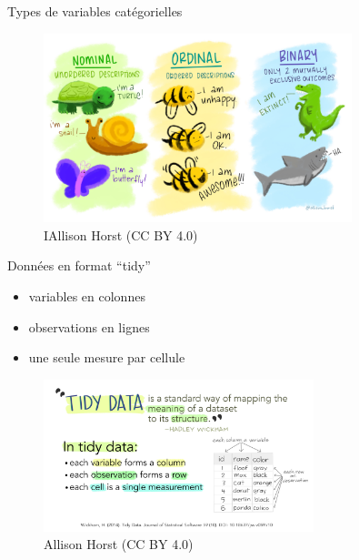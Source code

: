 \documentclass[
  ignorenonframetext,
]{beamer}
\providecommand{\tightlist}{%
  \setlength{\itemsep}{0pt}\setlength{\parskip}{0pt}}\usepackage{longtable,booktabs,array}
\begin{document}
\begin{frame}{Types de variables catégorielles}
\protect\hypertarget{types-de-variables-catuxe9gorielles}{}
\begin{figure}

{\centering \includegraphics[width=0.8\textwidth,height=\textheight]{figures/nominal_ordinal_binary.png}

}

\caption{IAllison Horst (CC BY 4.0)}

\end{figure}
\end{frame}

\begin{frame}{Données en format ``tidy''}
\protect\hypertarget{donnuxe9es-en-format-tidy}{}
\begin{itemize}
\tightlist
\item
  variables en colonnes
\item
  observations en lignes
\item
  une seule mesure par cellule
\end{itemize}

\begin{figure}

{\centering \includegraphics[width=0.7\textwidth,height=\textheight]{figures/tidydata_1.jpg}

}

\caption{Allison Horst (CC BY 4.0)}

\end{figure}
\end{frame}
\end{document}
